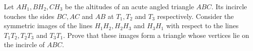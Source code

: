 Let $ AH_1, BH_2, CH_3$ be the altitudes of an acute angled triangle $ ABC$. Its incircle touches the sides $ BC, AC$ and $ AB$ at $ T_1, T_2$ and $ T_3$ respectively. Consider the symmetric images  of  the  lines $ H_1H_2, H_2H_3$ and $ H_3H_1$ with  respect  to  the  lines $ T_1T_2, T_2T_3$ and $ T_3T_1$.  Prove  that  these  images  form a  triangle  whose  vertices  lie  on  the incircle of $ ABC$.